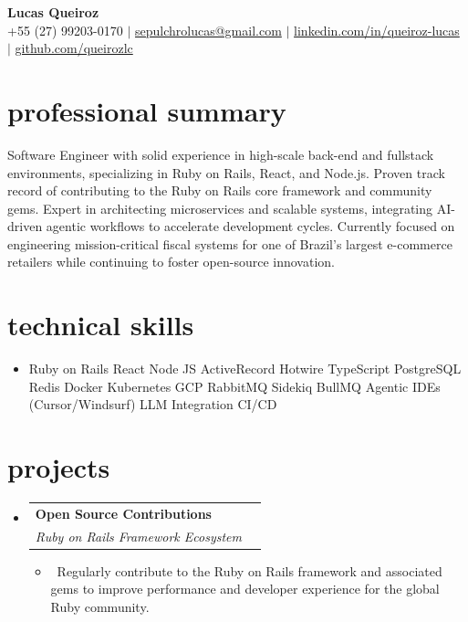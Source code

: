 \documentclass[letterpaper,10pt]{article}
\makeatletter
\newcommand{\resumeItem}[1]{\item\small{#1}}
\newcommand{\resumeSubheading}[4]{
\vspace{-1pt}\item
  \begin{tabular*}{0.97\textwidth}[t]{l@{\extracolsep{\fill}}r}
    \textbf{#1} & #2 \\
    \textit{#3} & \textit{#4} \\
  \end{tabular*}\vspace{-7pt}
}
\newcommand{\resumeSubHeadingList}{\begin{itemize}[leftmargin=0.15in, label={}]}
\newcommand{\resumeSubHeadingListEnd}{\end{itemize}}
\makeatother
\begin{document}
\begin{center}
  \textbf{\Huge Lucas Queiroz} \\
  \small +55 (27) 99203-0170 $|$ \href{mailto:sepulchrolucas@gmail.com}{sepulchrolucas@gmail.com} $|$ 
  \href{https://linkedin.com/in/queiroz-lucas}{linkedin.com/in/queiroz-lucas} $|$
  \href{https://github.com/queirozlc}{github.com/queirozlc}
\end{center}

\section*{professional summary}
Software Engineer with solid experience in high-scale back-end and fullstack environments, specializing in Ruby on Rails, React, and Node.js. Proven track record of contributing to the Ruby on Rails core framework and community gems. Expert in architecting microservices and scalable systems, integrating AI-driven agentic workflows to accelerate development cycles. Currently focused on engineering mission-critical fiscal systems for one of Brazil’s largest e-commerce retailers while continuing to foster open-source innovation.

\section{technical skills}
\resumeSubHeadingList
\resumeItem{Ruby on Rails \textbar{} React \textbar{} Node JS \textbar{} ActiveRecord \textbar{} Hotwire \textbar{} TypeScript \textbar{} PostgreSQL \textbar{} Redis \textbar{} Docker \textbar{} Kubernetes \textbar{} GCP \textbar{} RabbitMQ \textbar{} Sidekiq \textbar{} BullMQ \textbar{} Agentic IDEs (Cursor/Windsurf) \textbar{} LLM Integration \textbar{} CI/CD}\resumeSubHeadingListEnd

\section{projects}
\resumeSubHeadingList
  \resumeSubheading
      {Open Source Contributions}{}
      {Ruby on Rails Framework Ecosystem}{}{}
      \resumeSubHeadingList
          \resumeItem{\textbullet\ Regularly contribute to the Ruby on Rails framework and associated gems to improve performance and developer experience for the global Ruby community.}
      \resumeSubHeadingListEnd
\resumeSubHeadingListEnd
\end{document}
